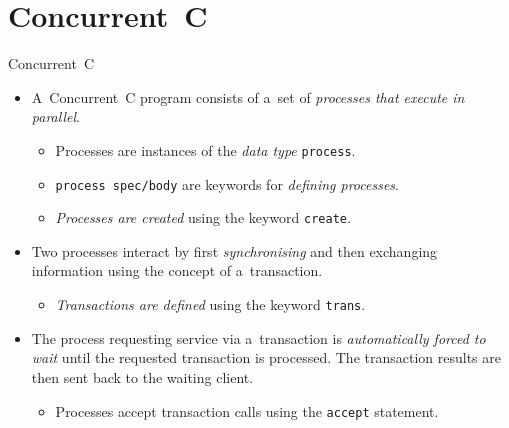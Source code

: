 \documentclass[
    10pt, hyperref={unicode, colorlinks, hypertexnames=false,
    linkcolor=white}, aspectratio=169
]{beamer}
\begin{document}
\section{Concurrent~C}
\begin{frame}{Concurrent~C}
    \begin{itemize}\setlength\itemsep{2.5em}
        \item
            A~\alert{Concurrent~C} program consists of a~set of
            \emph{processes that execute in parallel}.

            \begin{itemize}\setlength\itemsep{.5em}
                \item
                    Processes are instances of the \emph{data type}
                    \texttt{process}.

                \item
                    \texttt{process spec/body} are keywords for \emph{defining
                    processes}.

                \item
                    \emph{Processes are created} using the keyword
                    \texttt{create}.
            \end{itemize}

        \item
            Two processes interact by first \emph{synchronising}
            and then exchanging information using the concept of
            a~\alert{transaction}.

            \begin{itemize}
                \item
                    \emph{Transactions are defined} using the keyword
                    \texttt{trans}.
            \end{itemize}

        \item
            The process requesting service via a~\alert{transaction} is
            \emph{automatically forced to wait} until the requested
            transaction is processed. The transaction results are then
            sent back to the waiting client.

            \begin{itemize}\setlength\itemsep{.5em}
                \item
                    Processes \alert{accept transaction calls} using the
                    \texttt{accept} statement. %

            \end{itemize}
    \end{itemize}
\end{frame}
\end{document}
